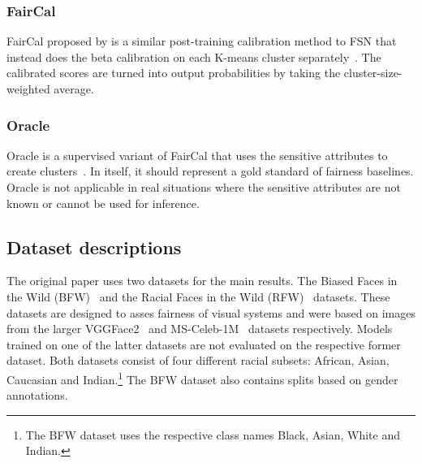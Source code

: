 \subsubsection{FairCal}
FairCal proposed by \citeauthor{salvador2022faircal} is a similar post-training calibration method to FSN that instead does the beta calibration on each K-means cluster separately~\cite{salvador2022faircal}.
The calibrated scores are turned into output probabilities by taking the cluster-size-weighted average.

\subsubsection{Oracle}
Oracle is a supervised variant of FairCal that uses the sensitive attributes to create clusters~\cite{salvador2022faircal}.
In itself, it should represent a gold standard of fairness baselines.
Oracle is not applicable in real situations where the sensitive attributes are not known or cannot be used for inference.

\subsection{Dataset descriptions}


The original paper uses two datasets for the main results.
The Biased Faces in the Wild (BFW)~\cite{DBLP:journals/corr/abs-2002-06483bfw} and the Racial Faces in the Wild (RFW)~\cite{Wang_2019_ICCVrfw1,wang2021metarfw2,wang2019skewnessrfw3,wang2018deeprfw4} datasets.
These datasets are designed to asses fairness of visual systems and were based on images from the larger VGGFace2~\cite{cao2018vggface2} and MS-Celeb-1M~\cite{10.1007/978-3-319-46487-9_6msceleb1} datasets respectively.
Models trained on one of the latter datasets are not evaluated on the respective former dataset.
Both datasets consist of four different racial subsets: African, Asian, Caucasian and Indian.\footnote{The BFW dataset uses the respective class names Black, Asian, White and Indian.}
The BFW dataset also contains splits based on gender annotations.

